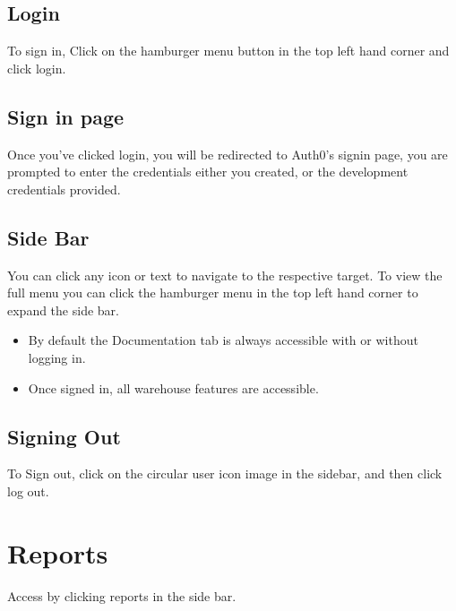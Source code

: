 \documentclass[letterpaper,10pt,english]{sphinxmanual}
\let\sphinxpxdimen\pdfpxdimen\else\newdimen\sphinxpxdimen
\let\oldsubsection\subsection
\renewcommand{\subsection}{\needspace{6\baselineskip}\oldsubsection}
\begin{document}
\subsection{Login}
\label{\detokenize{docs/ui/overview:login}}
To sign in, Click on the hamburger menu button in the top left hand
corner and click login.


\subsection{Sign in page}
\label{\detokenize{docs/ui/overview:sign-in-page}}
Once you’ve clicked login, you will be redirected to Auth0’s signin
page, you are prompted to enter the credentials either you created, or
the development credentials provided.

\noindent{\hspace*{\fill}\sphinxincludegraphics[width=500\sphinxpxdimen]{{signinPage}.png}\hspace*{\fill}}


\subsection{Side Bar}
\label{\detokenize{docs/ui/overview:side-bar}}
You can click any icon or text to navigate to the respective target. To
view the full menu you can click the hamburger menu in the top left hand
corner to expand the side bar.
\begin{itemize}
\item {} 
By default the Documentation tab is always accessible with or without logging in.

\item {} 
Once signed in, all warehouse features are accessible.

\end{itemize}


\subsection{Signing Out}
\label{\detokenize{docs/ui/overview:signing-out}}
To Sign out, click on the circular user icon image in the sidebar, and
then click log out.


\section{Reports}
\label{\detokenize{docs/ui/reports:reports}}\label{\detokenize{docs/ui/reports::doc}}
Access by clicking reports in the side bar.
\end{document}

